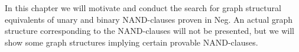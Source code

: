 In this chapter we will motivate and conduct the search for graph structural equivalents of unary and binary NAND-clauses proven in Neg.
An actual graph structure corresponding to the NAND-clauses will not be presented, but we will show some graph structures implying certain provable NAND-clauses.
